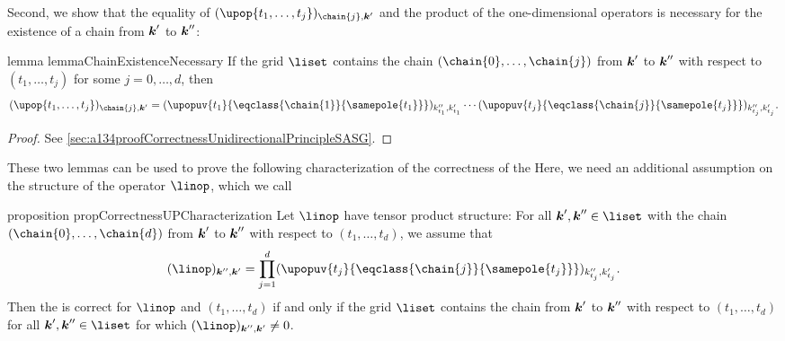 Second, we show that the equality of
$(\upop{t_1,\dotsc,t_j})_{\chain{j},\*k'}$ and the product of
the one-dimensional operators is necessary for the
existence of a chain from ${\boldsymbol{k}}'$ to ${\boldsymbol{k}}''$:

\begin{restatable}{%
  lemma%
}{%
  lemmaChainExistenceNecessary%
}
  \label{lemma:chainExistenceNecessary}
  If the grid $\liset$ contains the chain $(\chain{0}, \dotsc, \chain{j})$
  from ${\boldsymbol{k}}'$ to ${\boldsymbol{k}}''$ with respect to $(t_1, \dotsc, t_j)$
  for some $j = 0, \dotsc, d$, then
  \begin{equation}
    \label{eq:lemmaChainExistenceNecessary}
    (\upop{t_1,\dotsc,t_j})_{\chain{j},\*k'}
    = (\upopuv{t_1}{\eqclass{\chain{1}}{\samepole{t_1}}})_{k''_{t_1},k'_{t_1}}
    \dotsm
    (\upopuv{t_j}{\eqclass{\chain{j}}{\samepole{t_j}}})_{k''_{t_j},k'_{t_j}}.
  \end{equation}
\end{restatable}

\vspace{-0.5em}

\begin{proof}
  See \cref{sec:a134proofCorrectnessUnidirectionalPrincipleSASG}.
\end{proof}

\vspace{0.5em}

These two lemmas can be used to prove the following characterization
of the correctness of the \up{}
Here, we need an additional assumption on the structure of the
operator $\linop$, which we call 

\begin{restatable}{%
  proposition%
}{%
  propCorrectnessUPCharacterization%
}
  \label{prop:correctnessUPCharacterization}
  Let $\linop$ have tensor product structure:
  For all $\*k', \*k'' \in \liset$ with the chain
  $(\chain{0}, \dotsc, \chain{d})$ from ${\boldsymbol{k}}'$ to ${\boldsymbol{k}}''$
  with respect to $(t_1, \dotsc, t_d)$,
  we assume that
  \begin{equation}
    \label{eq:tensorProductOperator}
    (\linop)_{\*k'',\*k'}
    = \prod_{j=1}^d
    (\upopuv{t_j}{\eqclass{\chain{j}}{\samepole{t_j}}})_{k''_{t_j},k'_{t_j}}.
  \end{equation}
  Then the \up is correct for $\linop$ and $(t_1, \dotsc, t_d)$
  if and only if the grid $\liset$ contains the chain from ${\boldsymbol{k}}'$ to ${\boldsymbol{k}}''$
  with respect to $(t_1, \dotsc, t_d)$ for all $\*k', \*k'' \in \liset$
  for which $(\linop)_{\*k'',\*k'} \not= 0$.
\end{restatable}

